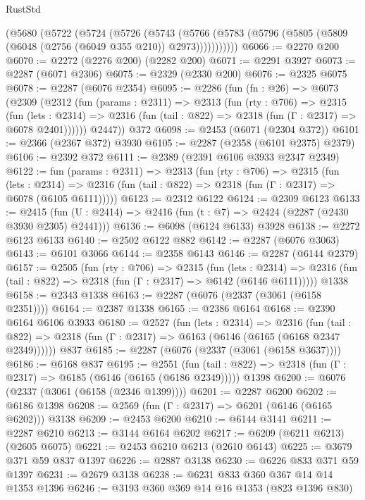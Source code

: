 \begin{lexlean}{RustStd}
\begin{coremodule}
    (@5680
      (@5722
        (@5724
          (@5726
            (@5743
              (@5766 (@5783 (@5796 (@5805 (@5809 (@6048 (@2756 (@6049 @355 @210)) @2973)))))))))))
@6066 := @2270 @200
@6070 := @2272 (@2276 @200) (@2282 @200)
@6071 := @2291 @3927
@6073 := @2287 (@6071 @2306)
@6075 := @2329 (@2330 @200)
@6076 := @2325 @6075
@6078 := @2287 (@6076 @2354)
@6095 := @2286
    (fun (fn : @26) =>
    @6073
      (@2309
        (@2312
          (fun (params : @2311) =>
          @2313
            (fun (rty : @706) =>
            @2315
              (fun (lets : @2314) =>
              @2316 (fun (tail : @822) => @2318 (fun (Γ : @2317) => @6078 @2401))))))
        @2447))
    @372
@6098 := @2453 (@6071 (@2304 @372))
@6101 := @2366 (@2367 @372) @3930
@6105 := @2287 (@2358 (@6101 @2375) @2379)
@6106 := @2392 @372
@6111 := @2389 (@2391 @6106 @3933 @2347 @2349)
@6122 := fun (params : @2311) =>
  @2313
    (fun (rty : @706) =>
    @2315
      (fun (lets : @2314) =>
      @2316 (fun (tail : @822) => @2318 (fun (Γ : @2317) => @6078 (@6105 @6111)))))
@6123 := @2312 @6122
@6124 := @2309 @6123
@6133 := @2415 (fun (U : @2414) => @2416 (fun (t : @7) => @2424 (@2287 (@2430 @3930 @2305) @2441)))
@6136 := @6098 (@6124 @6133) @3928
@6138 := @2272 @6123 @6133
@6140 := @2502 @6122 @882
@6142 := @2287 (@6076 @3063)
@6143 := @6101 @3066
@6144 := @2358 @6143
@6146 := @2287 (@6144 @2379)
@6157 := @2505
    (fun (rty : @706) =>
    @2315
      (fun (lets : @2314) =>
      @2316 (fun (tail : @822) => @2318 (fun (Γ : @2317) => @6142 (@6146 @6111)))))
    @1338
@6158 := @2343 @1338
@6163 := @2287 (@6076 (@2337 (@3061 (@6158 @2351))))
@6164 := @2387 @1338
@6165 := @2386 @6164
@6168 := @2390 @6164 @6106 @3933
@6180 := @2527
    (fun (lets : @2314) =>
    @2316
      (fun (tail : @822) => @2318 (fun (Γ : @2317) => @6163 (@6146 (@6165 (@6168 @2347 @2349))))))
    @837
@6185 := @2287 (@6076 (@2337 (@3061 (@6158 @3637))))
@6186 := @6168 @837
@6195 := @2551
    (fun (tail : @822) => @2318 (fun (Γ : @2317) => @6185 (@6146 (@6165 (@6186 @2349)))))
    @1398
@6200 := @6076 (@2337 (@3061 (@6158 (@2346 @1399))))
@6201 := @2287 @6200
@6202 := @6186 @1398
@6208 := @2569 (fun (Γ : @2317) => @6201 (@6146 (@6165 @6202))) @3138
@6209 := @2453 @6200
@6210 := @6144 @3141
@6211 := @2287 @6210
@6213 := @3144 @6164 @6202
@6217 := @6209 (@6211 @6213) (@2605 @6075)
@6221 := @2453 @6210 @6213 (@2610 @6143)
@6225 := @3679 @371 @59 @837 @1397
@6226 := @2887 @3138
@6230 := @6226 @833 @371 @59 @1397
@6231 := @2679 @3138
@6238 := @6231 @833 @360 @367 @14 @14 @1353 @1396
@6246 := @3193 @360 @369 @14 @16 @1353 (@823 @1396 @830)

\end{coremodule}
\end{lexlean}
